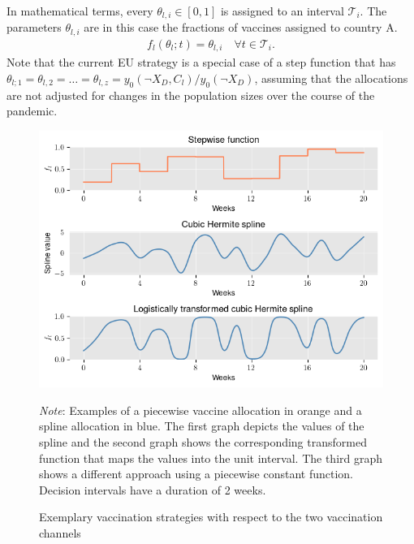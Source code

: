 In mathematical terms, every $\theta_{l,i} \in [0,1]$ is assigned to an interval $\mathcal{T}_i$. The parameters $\theta_{l,i}$ are in this case the fractions of vaccines assigned to country A.
\begin{align}
f_l(\theta_l; t) = \theta_{l,i} \quad \forall t \in \mathcal{T}_i.
\end{align}
Note that the current EU strategy is a special case of a step function that has $\theta_{l;1}= \theta_{l,2} = \hdots = \theta_{l,z}=y_0(\neg X_D, C_l)/y_0(\neg X_D)$, assuming that the allocations are not adjusted for changes in the population sizes over the course of the pandemic.
\begin{figure}[h!]
\centering
\includegraphics[scale=0.8]{images/example_methods.png}\\
\begin{flushleft}
\scriptsize{\textit{Note}: Examples of a piecewise vaccine allocation in orange and a spline allocation in blue. The first graph depicts the values of the spline and the second graph shows the corresponding transformed function that maps the values into the unit interval. The third graph shows a different approach using a piecewise constant function. Decision intervals have a duration of 2 weeks.}
\end{flushleft}
\caption{Exemplary vaccination strategies with respect to the two vaccination channels}
\label{fig:examples}
\end{figure}


